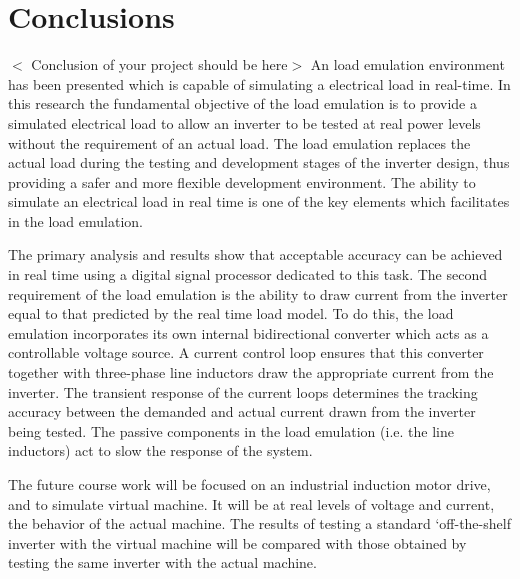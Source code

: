 \chapter{Conclusions}
$<$ Conclusion of your project should be here$>$\newline
An load emulation environment has been presented which is capable of simulating a electrical load in real-time. In this research the fundamental objective of the load emulation is to
provide a simulated electrical load to allow an inverter
to be tested at real power levels without the requirement of an actual load. 
The load emulation replaces the actual load during the testing and
development stages of the inverter design, thus providing a safer and more flexible development environment.
The ability to simulate an electrical load in real
time is one of the key elements which facilitates in the load emulation. \par
The primary analysis and results show that acceptable accuracy can be achieved in real time using a digital signal processor dedicated to this task.
The second requirement of the load emulation is the
ability to draw current from the inverter equal to that
predicted by the real time load model. To do this, the
load emulation incorporates its own internal bidirectional converter which acts as a controllable voltage
source. A current control loop ensures that this converter together with three-phase line inductors draw the
appropriate current from the inverter. The transient
response of the current loops determines the tracking
accuracy between the demanded and actual current
drawn from the inverter being tested. The passive components in the load emulation (i.e. the line inductors) act
to slow the response of the system.\par
The future course work will be focused on an industrial
induction motor drive, and to simulate virtual machine. It will be at real levels of voltage and current, the behavior of the actual machine. The results of testing a standard `off-the-shelf inverter with the virtual machine will be compared with those
obtained by testing the same inverter with the actual
machine.
